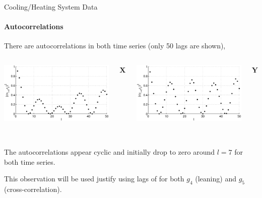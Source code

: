 \documentclass{beamer}
\begin{document}
\begin{frame}{Cooling/Heating System Data}
\framesubtitle{Autocorrelations}
There are autocorrelations in both time series (only 50 lags are shown),
\begin{columns}[c]
	\includegraphics[scale=0.33]{CoolingSystemExample_autocorrX.eps}\\
    \begin{center}$\mathbf{X}$\end{center}
	\includegraphics[scale=0.33]{CoolingSystemExample_autocorrY.eps}\\
    \begin{center}$\mathbf{Y}$\end{center}
\end{columns}
\hfill\\
The autocorrelations appear cyclic and initially drop to zero around $l=7$ for both time series.
\pause
\vspace{0.1in}

\alert{This observation will be used justify using lags of  for both $g_4$ (leaning) and $g_5$ (cross-correlation).}
\end{frame}
\end{document}
